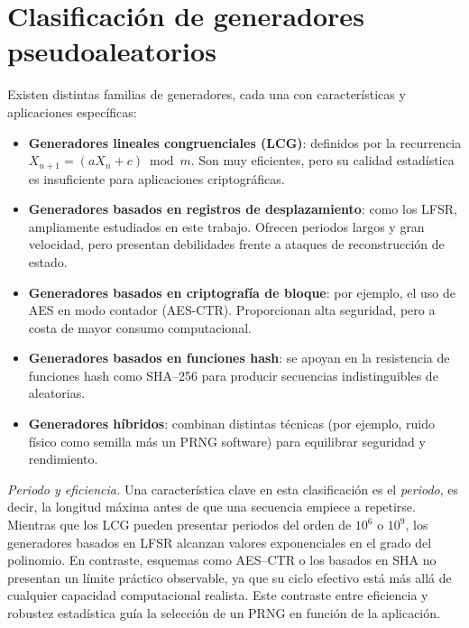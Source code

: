 \section*{Clasificación de generadores pseudoaleatorios}

Existen distintas familias de generadores, cada una con características y
aplicaciones específicas:

\begin{itemize}
    \item \textbf{Generadores lineales congruenciales (LCG)}: definidos por la
    recurrencia $X_{n+1} = (aX_n + c) \bmod m$. Son muy eficientes, pero su
    calidad estadística es insuficiente para aplicaciones criptográficas.

    \item \textbf{Generadores basados en registros de desplazamiento}: como los
    LFSR, ampliamente estudiados en este trabajo. Ofrecen periodos largos y gran
    velocidad, pero presentan debilidades frente a ataques de reconstrucción de
    estado.

    \item \textbf{Generadores basados en criptografía de bloque}: por ejemplo,
    el uso de AES en modo contador (AES-CTR). Proporcionan alta seguridad, pero
    a costa de mayor consumo computacional.

    \item \textbf{Generadores basados en funciones hash}: se apoyan en la
    resistencia de funciones hash como SHA--256 para producir secuencias
    indistinguibles de aleatorias.

    \item \textbf{Generadores híbridos}: combinan distintas técnicas (por
    ejemplo, ruido físico como semilla más un PRNG software) para equilibrar
    seguridad y rendimiento.
\end{itemize}

\medskip
\noindent\textit{Periodo y eficiencia.}
Una característica clave en esta clasificación es el \textit{periodo}, es decir, la longitud máxima antes de que una secuencia empiece a repetirse.
Mientras que los LCG pueden presentar periodos del orden de $10^6$ o $10^9$, los generadores basados en LFSR alcanzan valores exponenciales en el grado del polinomio.
En contraste, esquemas como AES--CTR o los basados en SHA no presentan un límite práctico observable, ya que su ciclo efectivo está más allá de cualquier capacidad computacional realista.
Este contraste entre eficiencia y robustez estadística guía la selección de un PRNG en función de la aplicación.

